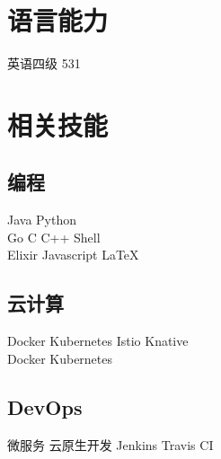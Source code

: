 \documentclass[]{deedy-resume-openfont}
\begin{document}
\begin{minipage}[t]{0.3\textwidth}
\sectionsep

\section{语言能力}
\sectionsep
英语四级 531 \\
\sectionsep


\section{相关技能}
\sectionsep
\subsection{编程}
Java \textbullet{} Python  \\
Go \textbullet{} C \textbullet{} C++ \textbullet{} Shell \\
Elixir \textbullet{} Javascript \textbullet{} \LaTeX\ \\ 
\sectionsep

\subsection{云计算}
Docker \textbullet{} Kubernetes \textbullet{} Istio \textbullet{} Knative \\
Docker \textbullet{} Kubernetes  \\
\sectionsep

\subsection{DevOps}
微服务 \textbullet{} 云原生开发 \textbullet{} Jenkins \textbullet{} Travis CI
\sectionsep



%
%

\end{minipage}
\end{document}
